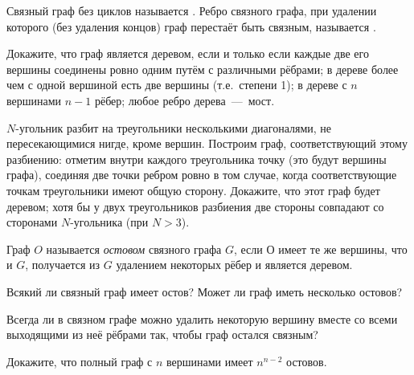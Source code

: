 \documentclass[12pt,a4paper]{article}
\begin{document}

Связный граф без циклов называется . Ребро связного графа, при удалении которого (без удаления концов) граф перестаёт быть связным, называется .


Докажите, что
 граф является деревом, если и только если каждые
две его вершины соединены ровно одним путём с различными рёбрами;
 в дереве более чем с одной вершиной есть две  вершины (т.е.~степени 1);
 в дереве с $n$ вершинами $n-1$ рёбер;  любое ребро дерева~---~мост.

$N$-угольник разбит на треугольники несколькими диагоналями, не
пересекающимися нигде, кроме вершин.
Построим граф, соответствующий этому разбиению: отметим внутри каждого
треугольника точку (это будут вершины
графа), соединяя две точки ребром ровно в том случае,
когда соответствующие точкам треугольники имеют общую сторону. Докажите, что
 этот граф будет деревом;
хотя бы у двух
треугольников разбиения две стороны
совпадают со сторонами $N$-угольника (при $N>3$).



Граф $O$ называется {\it остовом} связного графа $G$,
если $О$ имеет те же вершины, что и $G$,
получается из $G$ удалением некоторых р\"ебер и является деревом.

 Всякий ли связный граф имеет остов?  Может ли граф иметь несколько остовов?


Всегда ли в связном графе можно удалить некоторую вершину
вместе со всеми выходящими из не\"е р\"ебрами так, чтобы граф
остался связным?


 Докажите, что полный граф с $n$ вершинами имеет $n^{n-2}$ остовов.

%
\end{document}
